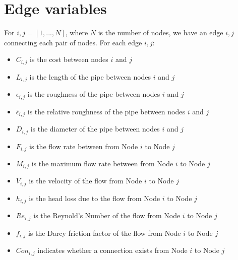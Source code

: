\documentclass[12pt]{article}
\begin{document}
	\section{Edge variables}
	For $i, j = [1, ..., N]$, where $N$ is the number of nodes, 
	we have an edge $i,j$ connecting each pair of nodes. For each edge $i,j$:
	\begin{itemize}
		\item $C_{i,j}$ is the cost between nodes $i$ and $j$
		\item $L_{i,j}$ is the length of the pipe between nodes $i$ and $j$
		\item $\epsilon_{i,j}$ is the roughness of the pipe between nodes $i$ and $j$
		\item $\bar{\epsilon}_{i,j}$ is the relative roughness of the pipe between 	nodes $i$ and $j$
		\item $D_{i,j}$ is the diameter of the pipe between nodes $i$ and $j$
		\item $F_{i,j}$ is the flow rate between from Node $i$ to Node $j$
		\item $M_{i,j}$ is the maximum flow rate between from Node $i$ to Node $j$
		\item $V_{i,j}$ is the velocity of the flow from Node $i$ to Node $j$
		\item $h_{i,j}$ is the head loss due to the flow from Node $i$ to Node $j$
		\item $Re_{i,j}$ is the Reynold's Number of the flow from Node $i$ to Node $j$
		\item $f_{i,j}$ is the Darcy friction factor of the flow from Node $i$ to Node $j$
		\item $Con_{i,j}$ indicates whether a connection exists from Node $i$ to Node $j$
	\end{itemize}
	
\end{document}
